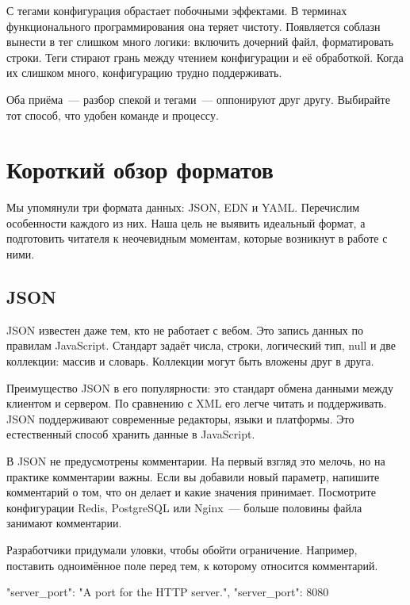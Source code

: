 С тегами конфигурация обрастает побочными эффектами. В терминах функционального
программирования она теряет чистоту. Появляется соблазн вынести в тег слишком
много логики: включить дочерний файл, форматировать строки. Теги стирают грань
между чтением конфигурации и е\"{е} обработкой. Когда их слишком много, конфигурацию
трудно поддерживать.

Оба при\"{е}ма~--- разбор спекой и тегами~--- оппонируют друг другу. Выбирайте тот
способ, что удобен команде и процессу.

\section{Короткий обзор форматов}

Мы упомянули три формата данных: JSON, EDN и YAML. Перечислим особенности
каждого из них. Наша цель не выявить идеальный формат, а подготовить читателя к
неочевидным моментам, которые возникнут в работе с ними.

\subsection{JSON}


JSON известен даже тем, кто не работает с вебом. Это запись данных по правилам
JavaScript. Стандарт зада\"{е}т числа, строки, логический тип, null и две коллекции:
массив и словарь. Коллекции могут быть вложены друг в друга.


Преимущество JSON в его популярности: это стандарт обмена данными между
клиентом и сервером. По сравнению с XML его легче читать и поддерживать. JSON
поддерживают современные редакторы, языки и платформы. Это естественный способ
хранить данные в JavaScript.

В JSON не предусмотрены комментарии. На первый взгляд это мелочь, но на практике
комментарии важны. Если вы добавили новый параметр, напишите комментарий о том,
что он делает и какие значения принимает. Посмотрите конфигурации Redis,
PostgreSQL или Nginx~--- больше половины файла занимают комментарии.

Разработчики придумали уловки, чтобы обойти ограничение. Например, поставить
одноим\"{е}нное поле перед тем, к которому относится комментарий.


\begin{english}
  \begin{json}
{
    "server_port": "A port for the HTTP server.",
    "server_port": 8080
}
  \end{json}
\end{english}

